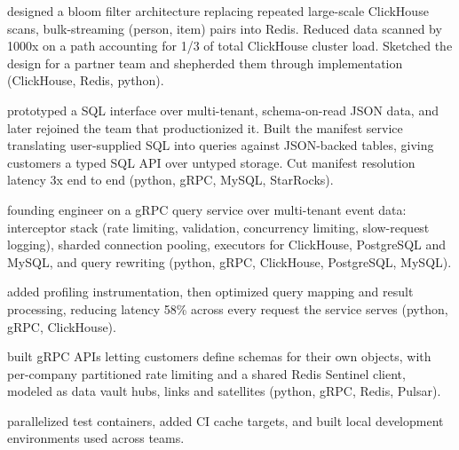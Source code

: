 


\begin{bullets}
    \item {}designed a bloom filter architecture replacing repeated large-scale ClickHouse scans, bulk-streaming (person, item) pairs into Redis. Reduced data scanned by {\mytilde}1000x on a path accounting for {\mytilde}1/3 of total ClickHouse cluster load. Sketched the design for a partner team and shepherded them through implementation (ClickHouse, Redis, python).
    \item {}prototyped a SQL interface over multi-tenant, schema-on-read JSON data, and later rejoined the team that productionized it. Built the manifest service translating user-supplied SQL into queries against JSON-backed tables, giving customers a typed SQL API over untyped storage. Cut manifest resolution latency 3x end to end (python, gRPC, MySQL, StarRocks).
    \item {}founding engineer on a gRPC query service over multi-tenant event data: interceptor stack (rate limiting, validation, concurrency limiting, slow-request logging), sharded connection pooling, executors for ClickHouse, PostgreSQL and MySQL, and query rewriting (python, gRPC, ClickHouse, PostgreSQL, MySQL).
    \item {}added profiling instrumentation, then optimized query mapping and result processing, reducing latency {\mytilde}58\% across every request the service serves (python, gRPC, ClickHouse).
    \item {}built gRPC APIs letting customers define schemas for their own objects, with per-company partitioned rate limiting and a shared Redis Sentinel client, modeled as data vault hubs, links and satellites (python, gRPC, Redis, Pulsar).
    \item {}parallelized test containers, added CI cache targets, and built local development environments used across teams.
\end{bullets}

